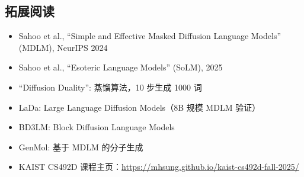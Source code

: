 \documentclass[a4paper]{article}
\begin{document}
\subsection{拓展阅读}

\begin{itemize}
    \item Sahoo et al., ``Simple and Effective Masked Diffusion Language Models'' (MDLM), NeurIPS 2024
    \item Sahoo et al., ``Esoteric Language Models'' (SoLM), 2025
    \item ``Diffusion Duality'': 蒸馏算法，10 步生成 1000 词
    \item LaDa: Large Language Diffusion Models（8B 规模 MDLM 验证）
    \item BD3LM: Block Diffusion Language Models
    \item GenMol: 基于 MDLM 的分子生成
    \item KAIST CS492D 课程主页：\url{https://mhsung.github.io/kaist-cs492d-fall-2025/}
\end{itemize}

\end{document}
